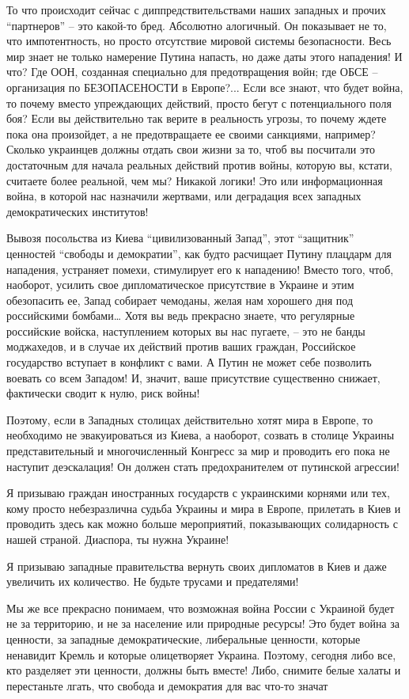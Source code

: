 То что происходит сейчас с диппредствительствами наших западных и  прочих
\enquote{партнеров} – это какой-то бред.  Абсолютно алогичный.  Он показывает не то,
что импотентность, но просто отсутствие мировой системы безопасности. Весь мир
знает не только намерение Путина напасть, но даже даты этого нападения! И что?
Где ООН, созданная специально для предотвращения войн; где ОБСЕ – организация
по БЕЗОПАСЕНОСТИ в Европе?... Если все знают, что будет война, то почему вместо
упреждающих действий, просто бегут с потенциального поля боя? Если вы
действительно так верите в реальность угрозы, то почему ждете пока она
произойдет, а не предотвращаете ее своими санкциями, например? Сколько
украинцев должны отдать свои жизни за то, чтоб вы посчитали это достаточным для
начала реальных действий против войны, которую вы, кстати, считаете более
реальной, чем мы?    Никакой логики! Это или информационная война, в которой
нас назначили жертвами,  или деградация всех западных демократических
институтов!

Вывозя посольства из Киева \enquote{цивилизованный Запад}, этот \enquote{защитник} ценностей
\enquote{свободы и демократии},  как будто расчищает Путину плацдарм для нападения,
устраняет помехи, стимулирует его к нападению! Вместо того, чтоб, наоборот,
усилить свое дипломатическое присутствие в Украине и этим обезопасить ее, Запад
собирает чемоданы, желая нам хорошего дня под российскими бомбами…  Хотя вы
ведь прекрасно знаете, что регулярные российские войска, наступлением которых
вы нас пугаете,  – это не банды моджахедов,  и в случае их действий против
ваших граждан, Российское государство вступает в конфликт с вами. А Путин не
может себе позволить воевать со всем Западом! И, значит, ваше присутствие
существенно снижает, фактически сводит к нулю, риск войны!

Поэтому, если в Западных столицах действительно хотят мира в Европе, то
необходимо не эвакуироваться из Киева, а наоборот, созвать в столице Украины
представительный и многочисленный Конгресс за мир и проводить его пока не
наступит деэскалация! Он должен стать предохранителем от путинской агрессии! 

Я призываю граждан иностранных государств   с украинскими корнями или тех, кому
просто небезразлична судьба  Украины и мира в Европе, прилетать в Киев и
проводить здесь как можно больше мероприятий,  показывающих солидарность с
нашей страной.  Диаспора, ты нужна Украине!

Я призываю западные правительства вернуть своих дипломатов в Киев и даже
увеличить их количество. Не будьте трусами и предателями!

Мы же все прекрасно понимаем, что возможная война России с Украиной будет не за
территорию, и не за население или природные ресурсы! Это будет война за
ценности, за западные демократические, либеральные ценности, которые ненавидит
Кремль и которые олицетворяет Украина. Поэтому, сегодня либо все, кто разделяет
эти ценности, должны быть вместе! Либо, снимите белые халаты и перестаньте
лгать, что свобода и демократия для вас что-то значат

